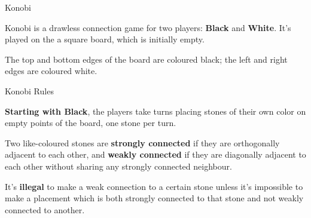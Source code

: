 \documentclass{beamer}
\begin{document}
  \begin{frame}{Konobi}

    Konobi is a drawless connection game for two players: \textbf{Black}
    and \textbf{White}. It's played on the a square board, which is initially empty. 

    \vspace{1em}

    The top and bottom edges of the board are coloured black; the left and right edges are coloured white.

    \vspace{1em}

    \begin{centering}


    \end{centering}

  \end{frame}



  \begin{frame}{Konobi Rules}

    \textbf{Starting with Black}, the players take turns placing stones of their own color on empty points of the board, one stone per turn.\pause

    \vspace{1em}

    Two like-coloured stones are \textbf{strongly connected} if they are orthogonally adjacent to each other, and \textbf{weakly connected} if they are diagonally adjacent to each other without sharing any strongly connected neighbour.\pause

    \vspace{1em}

    It's \textbf{illegal} to make a weak connection to a certain stone unless it's impossible to make a placement which is both strongly connected to that stone and not weakly connected to another.

  \end{frame}
\end{document}
